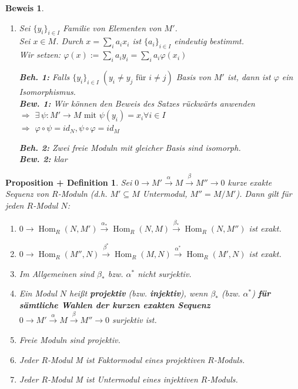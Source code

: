\documentclass[a4paper,12pt]{scrbook}
\theoremstyle{break}
\newtheorem{PropDef}[Def]{Proposition + Definition}
\theoremstyle{nonumberbreak}
\newtheorem{Bew}{Beweis}
\theoremstyle{nonumberplain}
\newcommand{\emp}[1]{\textbf{\emph{#1}}}
\DeclareMathOperator{\Hom}{Hom}
\begin{document}
\begin{Bew}
  \begin{enumerate}
    \item[(f)] Sei $\{y_i\}_{i \in I}$ Familie von Elementen von $M'$.\\
      Sei $x \in M$. Durch $x=\sum_{i}a_ix_i$ ist $\{a_i\}_{i  \in I}$
      eindeutig bestimmt.\\
      Wir setzen: $\varphi(x):=\sum_i a_iy_i=\sum_ia_i\varphi(x_i)$

      \textbf{Beh. 1:} Falls $\{y_i\}_{i\in I}\;(y_i \neq y_j \text{ für } i\neq
      j)$ Basis von $M'$ ist, dann ist $\varphi$ ein Isomorphismus.\\
      \textbf{Bew. 1:} Wir können den Beweis des Satzes rückwärts anwenden\\
      $\Rightarrow$ $\exists\, \psi: M' \rightarrow M \text{ mit } \psi(y_i)=x_i \forall i \in I$\\
      $\Rightarrow$ $\varphi \circ \psi = id_N, \psi \circ \varphi = id_M$

      \textbf{Beh. 2:} Zwei freie Moduln mit gleicher Basis sind isomorph.\\
      \textbf{Bew. 2:} klar
  \end{enumerate}
\end{Bew}

\begin{PropDef}
  Sei $0 \to M' \overset{\alpha}{\to} M \overset{\beta}{\to} M'' \to 0$ kurze exakte Sequenz von $R$-Moduln (d.h.
  $M' \subseteq M$ Untermodul, $M'' = M/M'$). Dann gilt für jeden $R$-Modul $N$:
  \begin{enumerate}
    \item $0 \to \Hom_R(N,M') \overset{\alpha_*}{\to} \Hom_R(N,M) \overset{\beta_*}{\to}
          \Hom_R(N,M'')$ ist exakt.
    \item $0 \to \Hom_R(M'',N) \overset{\beta^*}{\to} \Hom_R(M,N) \overset{\alpha^*}{\to}
          \Hom_R(M',N)$ ist exakt.
    \item Im Allgemeinen sind $\beta_*$ bzw. $\alpha^*$ nicht surjektiv.
    \item Ein Modul $N$ heißt \emp{projektiv} (bzw.
          \emp{injektiv}), wenn $\beta_*$ (bzw.
          $\alpha^*$) \textbf{für sämtliche Wahlen der kurzen exakten Sequenz
          $0 \to M' \overset{\alpha}{\to} M \overset{\beta}{\to} M'' \to 0$} surjektiv ist.
    \item Freie Moduln sind projektiv.
    \item Jeder $R$-Modul M ist Faktormodul eines projektiven $R$-Moduls.
    \item Jeder $R$-Modul M ist Untermodul eines injektiven $R$-Moduls.
  \end{enumerate}
\end{PropDef}
\end{document}
